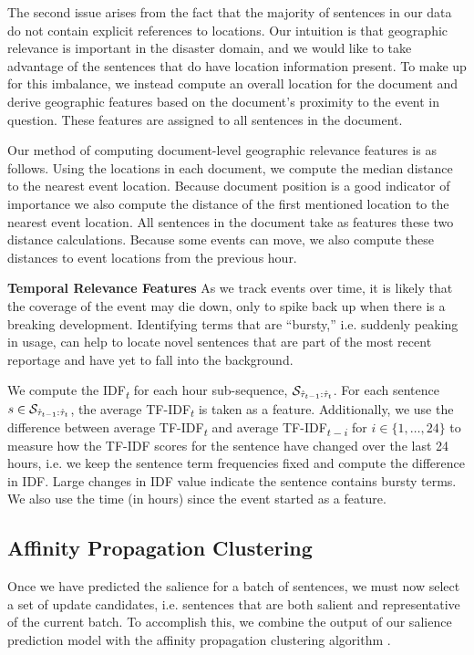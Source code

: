 The second issue arises from the fact that the majority of sentences in our
data do not contain explicit references to locations.  Our intuition is that
geographic relevance is important in the disaster domain, and we would like to
take advantage of the sentences that do have location information present. To
make up for this imbalance, we instead compute an overall location for the
document and derive geographic features based on the document's proximity to
the event in question. These features are assigned to all sentences in the
document.

Our method of computing document-level geographic relevance features is as
follows. Using the locations in each document, we compute the median distance
to the nearest event location. Because document position is a good indicator of
importance we also compute the distance of the first mentioned location to the
nearest event location. All sentences in the document take as features these
two distance calculations. Because some events can move, we also compute these
distances to event locations from the previous hour.

\textbf{Temporal Relevance Features} As we track events over time, it is likely
that the coverage of the event may die down, only to spike back up when there
is a breaking development.  Identifying terms that are ``bursty,'' i.e.
suddenly peaking in usage, can help to locate novel sentences that are part of
the most recent reportage and have yet to fall into the background.

We compute the IDF\textsubscript{$t$} for each hour sub-sequence,
$\mathcal{S}_{\hat{\tau}_{{t-1}}:\hat{\tau}_t}$. For each sentence $s \in
\mathcal{S}_{\hat{\tau}_{{t-1}}:\hat{\tau}_t}$, the average TF-IDF\textsubscript{$t$} is
taken as a feature. Additionally, we use the difference between average
TF-IDF\textsubscript{$t$} and average TF-IDF\textsubscript{$t-i$}  for $i \in
\{1, \ldots, 24\}$ to measure how the TF-IDF scores for the sentence have
changed over the last 24 hours, i.e. we keep the sentence term frequencies
fixed and compute the difference in IDF. Large changes in IDF value indicate
the sentence contains bursty terms.  We also use the time (in hours) since the
event started as a feature.

\subsection{\colorbox{green!20!}{Affinity Propagation Clustering}}
\label{sec:exsel}

Once we have predicted the salience for a batch of sentences, we must now
select a set of update candidates, i.e. sentences that are both salient and
representative of the current batch. To accomplish this, we combine the output
of our salience prediction model with the affinity propagation clustering
algorithm \citep{frey2007}.

